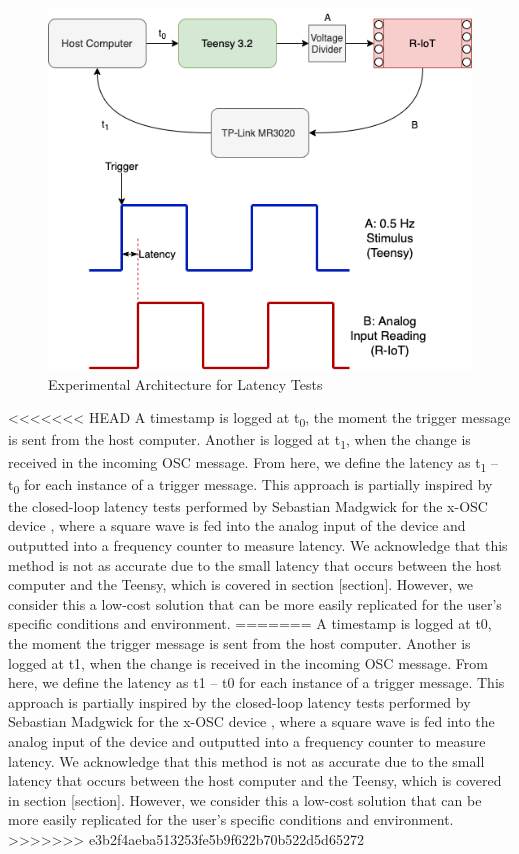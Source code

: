 \begin{figure}[ht]
  \centering
    \includegraphics[width=\textwidth]{Chapters/Figures/technical/Latency/figure1.png}
    \caption{Experimental Architecture for Latency Tests}
    \label{fig:latency_fig1}
\end{figure}

<<<<<<< HEAD
A timestamp is logged at t\textsubscript{0}, the moment the trigger message is sent from the host computer. Another is logged at t\textsubscript{1}, when the change is received in the incoming OSC message. From here, we define the latency as t\textsubscript{1} – t\textsubscript{0} for each instance of a trigger message. This approach is partially inspired by the closed-loop latency tests performed by Sebastian Madgwick for the x-OSC device \cite{Madgwick}, where a square wave is fed into the analog input of the device and outputted into a frequency counter to measure latency. We acknowledge that this method is not as accurate due to the small latency that occurs between the host computer and the Teensy, which is covered in section [section]. However, we consider this a low-cost solution that can be more easily replicated for the user’s specific conditions and environment.
=======
A timestamp is logged at t0, the moment the trigger message is sent from the host computer. Another is logged at t1, when the change is received in the incoming OSC message. From here, we define the latency as t1 – t0 for each instance of a trigger message. This approach is partially inspired by the closed-loop latency tests performed by Sebastian Madgwick for the x-OSC device \cite{Madgwick}, where a square wave is fed into the analog input of the device and outputted into a frequency counter to measure latency. We acknowledge that this method is not as accurate due to the small latency that occurs between the host computer and the Teensy, which is covered in section [section]. However, we consider this a low-cost solution that can be more easily replicated for the user’s specific conditions and environment.
>>>>>>> e3b2f4aeba513253fe5b9f622b70b522d5d65272

